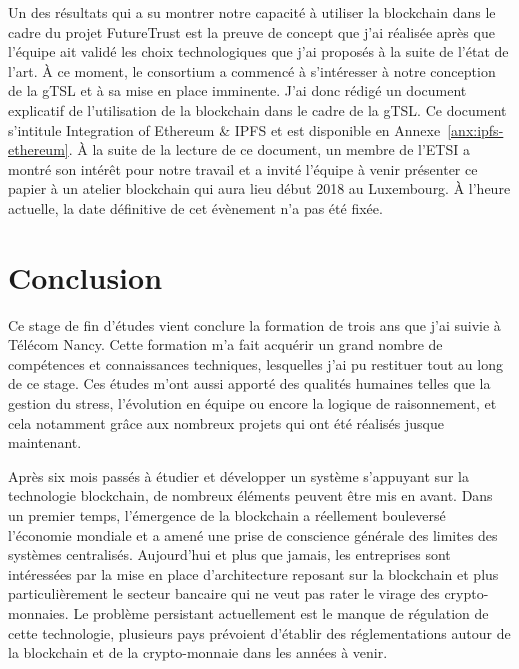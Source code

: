 \documentclass{tnreport}
\begin{document}
Un des résultats qui a su montrer notre capacité à utiliser la blockchain dans le cadre du projet FutureTrust est la preuve de concept que j'ai réalisée après que l'équipe ait validé les choix technologiques que j'ai proposés à la suite de l'état de l'art. À ce moment, le consortium a commencé à s'intéresser à notre conception de la gTSL et à sa mise en place imminente. J'ai donc rédigé un document explicatif de l'utilisation de la blockchain dans le cadre de la gTSL. Ce document s'intitule Integration of Ethereum \& IPFS et est disponible en Annexe~\ref{anx:ipfs-ethereum}. À la suite de la lecture de ce document, un membre de l'ETSI a montré son intérêt pour notre travail et a invité l'équipe à venir présenter ce papier à un atelier blockchain qui aura lieu début 2018 au Luxembourg. À l'heure actuelle, la date définitive de cet évènement n'a pas été fixée.

\chapter{Conclusion}

Ce stage de fin d'études vient conclure la formation de trois ans que j'ai suivie à Télécom Nancy. Cette formation m'a fait acquérir un grand nombre de compétences et connaissances techniques, lesquelles j'ai pu restituer tout au long de ce stage. Ces études m'ont aussi apporté des qualités humaines telles que la gestion du stress, l'évolution en équipe ou encore la logique de raisonnement, et cela notamment grâce aux nombreux projets qui ont été réalisés jusque maintenant.

Après six mois passés à étudier et développer un système s'appuyant sur la technologie blockchain, de nombreux éléments peuvent être mis en avant. Dans un premier temps, l'émergence de la blockchain a réellement bouleversé l'économie mondiale et a amené une prise de conscience générale des limites des systèmes centralisés. Aujourd'hui et plus que jamais, les entreprises sont intéressées par la mise en place d'architecture reposant sur la blockchain et plus particulièrement le secteur bancaire qui ne veut pas rater le virage des crypto-monnaies. Le problème persistant actuellement est le manque de régulation de cette technologie, plusieurs pays prévoient d'établir des réglementations autour de la blockchain et de la crypto-monnaie dans les années à venir.
\end{document}
